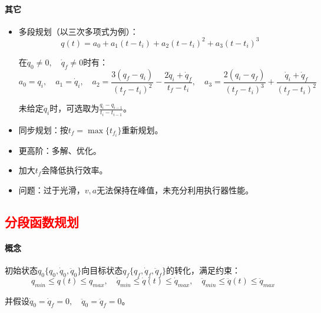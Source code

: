 \documentclass[
12pt, %
a4paper, 
oneside, %
]{scrartcl}
\begin{document}
\paragraph{其它}
\begin{itemize}
\item 多段规划（以三次多项式为例）：
$$ q(t) = a_0 + a_1(t - t_i) + a_2(t - t_i)^2 + a_3(t - t_i)^3 $$

在$ \dot{q}_0 \neq 0, \quad \dot{q}_f \neq 0 $时有：
$$ a_0 = q_i, \quad a_1 = \dot{q}_i, \quad a_2 = \frac{3(q_f - q_i)}{(t_f - t_i)^2} - \frac{2\dot{q}_i + \dot{q}_f}{t_f - t_i}, \quad a_3 = \frac{2(q_i - q_f)}{(t_f - t_i)^3} + \frac{\dot{q}_i + \dot{q}_f}{(t_f - t_i)^2} $$

未给定$ \dot{q}_i $时，可选取为$ \frac{q_i - q_{i - 1}}{t_i - t_{i - 1}} $。
\item 同步规划：按$ t_f = \max\{t_{f_i}\} $重新规划。
\item 更高阶：多解、优化。
\item 加大$ t_f $会降低执行效率。
\item 问题：过于光滑，$ v, a $无法保持在峰值，未充分利用执行器性能。
\end{itemize}
\subsection[分段函数规划]{\textcolor{red}{分段函数规划}}
\paragraph{概念}
初始状态$ q_0\{q_0, \dot{q}_0, \ddot{q}_0\} $向目标状态$ q_f\{q_f, \dot{q}_f, \ddot{q}_f\} $的转化，满足约束：
$$ q_{min} \leq q(t) \leq q_{max}, \quad \dot{q}_{min} \leq \dot{q}(t) \leq \dot{q}_{max}, \quad \ddot{q}_{min} \leq \ddot{q}(t) \leq \ddot{q}_{max} $$

并假设$ \dot{q}_0 = \dot{q}_f = 0, \quad \ddot{q}_0 = \ddot{q}_f = 0 $。
\end{document}

